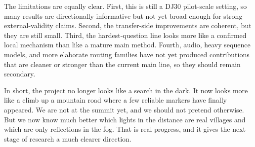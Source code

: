 \documentclass[11pt]{article}
\begin{document}
The limitations are equally clear. First, this is still a DJ30 pilot-scale setting, so many results are directionally informative but not yet broad enough for strong external-validity claims. Second, the transfer-side improvements are coherent, but they are still small. Third, the hardest-question line looks more like a confirmed local mechanism than like a mature main method. Fourth, audio, heavy sequence models, and more elaborate routing families have not yet produced contributions that are cleaner or stronger than the current main line, so they should remain secondary.

In short, the project no longer looks like a search in the dark. It now looks more like a climb up a mountain road where a few reliable markers have finally appeared. We are not at the summit yet, and we should not pretend otherwise. But we now know much better which lights in the distance are real villages and which are only reflections in the fog. That is real progress, and it gives the next stage of research a much clearer direction.
\end{document}
